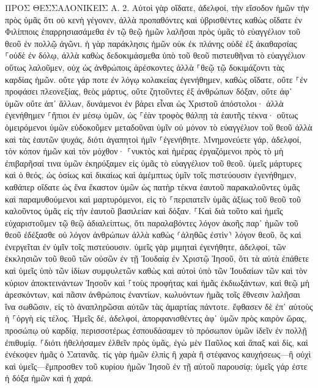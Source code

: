 \documentclass[twoside, 9pt]{extreport}
\begin{document}
ΠΡΟΣ ΘΕΣΣΑΛΟΝΙΚΕΙΣ Α.
2.
Αὐτοὶ γὰρ οἴδατε, ἀδελφοί, τὴν εἴσοδον ἡμῶν τὴν πρὸς ὑμᾶς ὅτι οὐ κενὴ γέγονεν, 
ἀλλὰ προπαθόντες καὶ ὑβρισθέντες καθὼς οἴδατε ἐν Φιλίπποις ἐπαρρησιασάμεθα ἐν τῷ θεῷ ἡμῶν λαλῆσαι πρὸς ὑμᾶς τὸ εὐαγγέλιον τοῦ θεοῦ ἐν πολλῷ ἀγῶνι. 
ἡ γὰρ παράκλησις ἡμῶν οὐκ ἐκ πλάνης οὐδὲ ἐξ ἀκαθαρσίας ⸀οὐδὲ ἐν δόλῳ, 
ἀλλὰ καθὼς δεδοκιμάσμεθα ὑπὸ τοῦ θεοῦ πιστευθῆναι τὸ εὐαγγέλιον οὕτως λαλοῦμεν, οὐχ ὡς ἀνθρώποις ἀρέσκοντες ἀλλὰ ⸀θεῷ τῷ δοκιμάζοντι τὰς καρδίας ἡμῶν. 
οὔτε γάρ ποτε ἐν λόγῳ κολακείας ἐγενήθημεν, καθὼς οἴδατε, οὔτε ⸀ἐν προφάσει πλεονεξίας, θεὸς μάρτυς, 
οὔτε ζητοῦντες ἐξ ἀνθρώπων δόξαν, οὔτε ἀφ᾽ ὑμῶν οὔτε ἀπ᾽ ἄλλων, 
δυνάμενοι ἐν βάρει εἶναι ὡς Χριστοῦ ἀπόστολοι· ἀλλὰ ἐγενήθημεν ⸀ἤπιοι ἐν μέσῳ ὑμῶν, ὡς ⸀ἐὰν τροφὸς θάλπῃ τὰ ἑαυτῆς τέκνα· 
οὕτως ὁμειρόμενοι ὑμῶν εὐδοκοῦμεν μεταδοῦναι ὑμῖν οὐ μόνον τὸ εὐαγγέλιον τοῦ θεοῦ ἀλλὰ καὶ τὰς ἑαυτῶν ψυχάς, διότι ἀγαπητοὶ ἡμῖν ⸀ἐγενήθητε. 
Μνημονεύετε γάρ, ἀδελφοί, τὸν κόπον ἡμῶν καὶ τὸν μόχθον· ⸀νυκτὸς καὶ ἡμέρας ἐργαζόμενοι πρὸς τὸ μὴ ἐπιβαρῆσαί τινα ὑμῶν ἐκηρύξαμεν εἰς ὑμᾶς τὸ εὐαγγέλιον τοῦ θεοῦ. 
ὑμεῖς μάρτυρες καὶ ὁ θεός, ὡς ὁσίως καὶ δικαίως καὶ ἀμέμπτως ὑμῖν τοῖς πιστεύουσιν ἐγενήθημεν, 
καθάπερ οἴδατε ὡς ἕνα ἕκαστον ὑμῶν ὡς πατὴρ τέκνα ἑαυτοῦ 
παρακαλοῦντες ὑμᾶς καὶ παραμυθούμενοι καὶ μαρτυρόμενοι, εἰς τὸ ⸀περιπατεῖν ὑμᾶς ἀξίως τοῦ θεοῦ τοῦ καλοῦντος ὑμᾶς εἰς τὴν ἑαυτοῦ βασιλείαν καὶ δόξαν. 
⸀Καὶ διὰ τοῦτο καὶ ἡμεῖς εὐχαριστοῦμεν τῷ θεῷ ἀδιαλείπτως, ὅτι παραλαβόντες λόγον ἀκοῆς παρ᾽ ἡμῶν τοῦ θεοῦ ἐδέξασθε οὐ λόγον ἀνθρώπων ἀλλὰ καθὼς ⸂ἀληθῶς ἐστὶν⸃ λόγον θεοῦ, ὃς καὶ ἐνεργεῖται ἐν ὑμῖν τοῖς πιστεύουσιν. 
ὑμεῖς γὰρ μιμηταὶ ἐγενήθητε, ἀδελφοί, τῶν ἐκκλησιῶν τοῦ θεοῦ τῶν οὐσῶν ἐν τῇ Ἰουδαίᾳ ἐν Χριστῷ Ἰησοῦ, ὅτι τὰ αὐτὰ ἐπάθετε καὶ ὑμεῖς ὑπὸ τῶν ἰδίων συμφυλετῶν καθὼς καὶ αὐτοὶ ὑπὸ τῶν Ἰουδαίων 
τῶν καὶ τὸν κύριον ἀποκτεινάντων Ἰησοῦν καὶ ⸀τοὺς προφήτας καὶ ἡμᾶς ἐκδιωξάντων, καὶ θεῷ μὴ ἀρεσκόντων, καὶ πᾶσιν ἀνθρώποις ἐναντίων, 
κωλυόντων ἡμᾶς τοῖς ἔθνεσιν λαλῆσαι ἵνα σωθῶσιν, εἰς τὸ ἀναπληρῶσαι αὐτῶν τὰς ἁμαρτίας πάντοτε. ἔφθασεν δὲ ἐπ᾽ αὐτοὺς ἡ ⸀ὀργὴ εἰς τέλος. 
Ἡμεῖς δέ, ἀδελφοί, ἀπορφανισθέντες ἀφ᾽ ὑμῶν πρὸς καιρὸν ὥρας, προσώπῳ οὐ καρδίᾳ, περισσοτέρως ἐσπουδάσαμεν τὸ πρόσωπον ὑμῶν ἰδεῖν ἐν πολλῇ ἐπιθυμίᾳ. 
⸀διότι ἠθελήσαμεν ἐλθεῖν πρὸς ὑμᾶς, ἐγὼ μὲν Παῦλος καὶ ἅπαξ καὶ δίς, καὶ ἐνέκοψεν ἡμᾶς ὁ Σατανᾶς. 
τίς γὰρ ἡμῶν ἐλπὶς ἢ χαρὰ ἢ στέφανος καυχήσεως—ἢ οὐχὶ καὶ ὑμεῖς—ἔμπροσθεν τοῦ κυρίου ἡμῶν Ἰησοῦ ἐν τῇ αὐτοῦ παρουσίᾳ; 
ὑμεῖς γάρ ἐστε ἡ δόξα ἡμῶν καὶ ἡ χαρά. 
\end{document}
